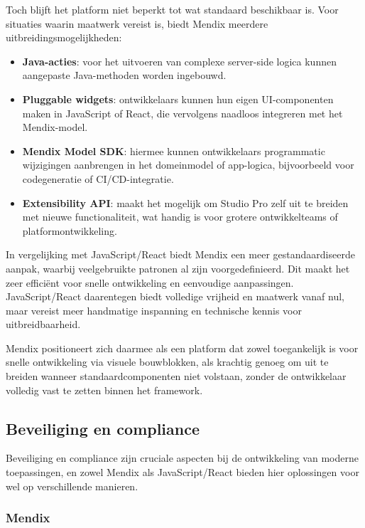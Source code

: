 Toch blijft het platform niet beperkt tot wat standaard beschikbaar is. Voor situaties waarin maatwerk vereist is, biedt Mendix meerdere uitbreidingsmogelijkheden:
\begin{itemize}
    \item \textbf{Java-acties}: voor het uitvoeren van complexe server-side logica kunnen aangepaste Java-methoden worden ingebouwd.
    \item \textbf{Pluggable widgets}: ontwikkelaars kunnen hun eigen UI-componenten maken in JavaScript of React, die vervolgens naadloos integreren met het Mendix-model.
    \item \textbf{Mendix Model SDK}: hiermee kunnen ontwikkelaars programmatic wijzigingen aanbrengen in het domeinmodel of app-logica, bijvoorbeeld voor codegeneratie of CI/CD-integratie.
    \item \textbf{Extensibility \gls{API}}: maakt het mogelijk om Studio Pro zelf uit te breiden met nieuwe functionaliteit, wat handig is voor grotere ontwikkelteams of platformontwikkeling.
\end{itemize}

In vergelijking met JavaScript/React biedt Mendix een meer gestandaardiseerde aanpak, waarbij veelgebruikte patronen al zijn voorgedefinieerd. Dit maakt het zeer efficiënt voor snelle ontwikkeling en eenvoudige aanpassingen. JavaScript/React daarentegen biedt volledige vrijheid en maatwerk vanaf nul, maar vereist meer handmatige inspanning en technische kennis voor uitbreidbaarheid.

Mendix positioneert zich daarmee als een platform dat zowel toegankelijk is voor snelle ontwikkeling via visuele bouwblokken, als krachtig genoeg om uit te breiden wanneer standaardcomponenten niet volstaan, zonder de ontwikkelaar volledig vast te zetten binnen het framework.


\subsection{Beveiliging en compliance}

Beveiliging en compliance zijn cruciale aspecten bij de ontwikkeling van moderne toepassingen, en zowel Mendix als JavaScript/React bieden hier oplossingen voor wel  op verschillende manieren.

\subsubsection{Mendix}

